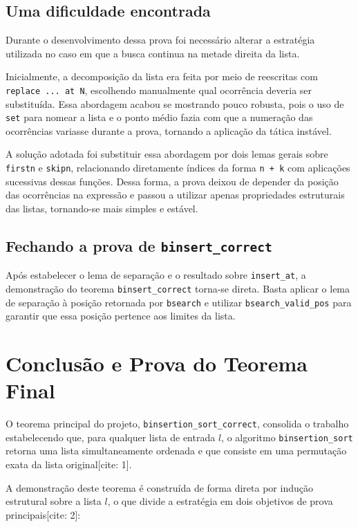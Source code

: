 \documentclass{article}
\begin{document}
\subsection{Uma dificuldade encontrada}

Durante o desenvolvimento dessa prova foi necessário alterar a estratégia
utilizada no caso em que a busca continua na metade direita da lista.

Inicialmente, a decomposição da lista era feita por meio de reescritas com
\texttt{replace ... at N}, escolhendo manualmente qual ocorrência deveria
ser substituída. Essa abordagem acabou se mostrando pouco robusta, pois o
uso de \texttt{set} para nomear a lista e o ponto médio fazia com que a
numeração das ocorrências variasse durante a prova, tornando a aplicação da
tática instável.

A solução adotada foi substituir essa abordagem por dois lemas gerais sobre
\texttt{firstn} e \texttt{skipn}, relacionando diretamente índices da forma
\texttt{n + k} com aplicações sucessivas dessas funções. Dessa forma, a
prova deixou de depender da posição das ocorrências na expressão e passou a
utilizar apenas propriedades estruturais das listas, tornando-se mais
simples e estável.

\subsection{Fechando a prova de \texttt{binsert\_correct}}

Após estabelecer o lema de separação e o resultado sobre
\texttt{insert\_at}, a demonstração do teorema
\texttt{binsert\_correct} torna-se direta. Basta aplicar o lema de
separação à posição retornada por \texttt{bsearch} e utilizar
\texttt{bsearch\_valid\_pos} para garantir que essa posição pertence aos
limites da lista.

\section{Conclusão e Prova do Teorema Final}
\label{sec:vinicius}

O teorema principal do projeto, \texttt{binsertion\_sort\_correct}, consolida o trabalho estabelecendo que, para qualquer lista de entrada $l$, o algoritmo \texttt{binsertion\_sort} retorna uma lista simultaneamente ordenada e que consiste em uma permutação exata da lista original[cite: 1].

A demonstração deste teorema é construída de forma direta por indução estrutural sobre a lista $l$, o que divide a estratégia em dois objetivos de prova principais[cite: 2]:
\end{document}
